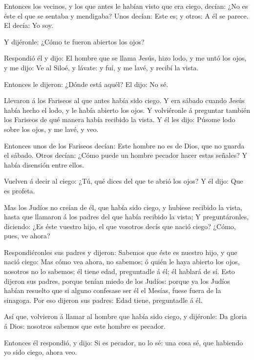  Entonces los vecinos, y los que antes le habían visto que
era ciego, decían: ¿No es éste el que se sentaba y mendigaba?
 Unos decían: Este es; y otros: A él se parece. El decía: Yo
soy.

 Y dijéronle: ¿Cómo te fueron abiertos los ojos?

 Respondió él y dijo: El hombre que se llama Jesús, hizo
lodo, y me untó los ojos, y me dijo: Ve al Siloé, y lávate: y fuí, y me
lavé, y recibí la vista.

 Entonces le dijeron: ¿Dónde está aquél? El dijo: No sé.

 Llevaron á los Fariseos al que antes había sido ciego.
 Y era sábado cuando Jesús había hecho el lodo, y le había
abierto los ojos.  Y volviéronle á preguntar también los
Fariseos de qué manera había recibido la vista. Y él les dijo: Púsome
lodo sobre los ojos, y me lavé, y veo.

 Entonces unos de los Fariseos decían: Este hombre no es de
Dios, que no guarda el sábado. Otros decían: ¿Cómo puede un hombre
pecador hacer estas señales? Y había disensión entre ellos.

 Vuelven á decir al ciego: ¿Tú, qué dices del que te abrió
los ojos? Y él dijo: Que es profeta.

 Mas los Judíos no creían de él, que había sido ciego, y
hubiese recibido la vista, hasta que llamaron á los padres del que había
recibido la vista;  Y preguntáronles, diciendo: ¿Es éste
vuestro hijo, el que vosotros decís que nació ciego? ¿Cómo, pues, ve
ahora?

 Respondiéronles sus padres y dijeron: Sabemos que éste es
nuestro hijo, y que nació ciego:  Mas cómo vea ahora, no
sabemos; ó quién le haya abierto los ojos, nosotros no lo sabemos; él
tiene edad, preguntadle á él; él hablará de sí.  Esto
dijeron sus padres, porque tenían miedo de los Judíos: porque ya los
Judíos habían resuelto que si alguno confesase ser él el Mesías, fuese
fuera de la sinagoga.  Por eso dijeron sus padres: Edad
tiene, preguntadle á él.

 Así que, volvieron á llamar al hombre que había sido
ciego, y dijéronle: Da gloria á Dios: nosotros sabemos que este hombre
es pecador.

 Entonces él respondió, y dijo: Si es pecador, no lo sé:
una cosa sé, que habiendo yo sido ciego, ahora veo.

